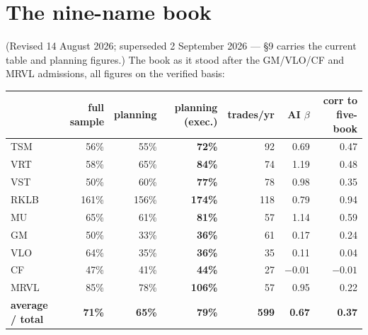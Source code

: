 \documentclass[11pt,a4paper]{article}
\begin{document}
\section{The nine-name book}

(Revised 14 August 2026; superseded 2 September 2026 --- \S9 carries the
current table and planning figures.)
The book as it stood after the GM/VLO/CF and MRVL admissions, all figures on
the verified basis:

\begin{center}
\begin{tabular}{lrrrrrr}
\toprule
 & full sample & planning & \textbf{planning (exec.)} & trades/yr & AI $\beta$ & corr to five-book \\
\midrule
TSM  &  56\% &  55\% & \textbf{72\%} &  92 & 0.69 & 0.47 \\
VRT  &  58\% &  65\% & \textbf{84\%} &  74 & 1.19 & 0.48 \\
VST  &  50\% &  60\% & \textbf{77\%} &  78 & 0.98 & 0.35 \\
RKLB & 161\% & 156\% & \textbf{174\%} & 118 & 0.79 & 0.94 \\
MU   &  65\% &  61\% & \textbf{81\%} &  57 & 1.14 & 0.59 \\
GM   &  50\% &  33\% & \textbf{36\%} &  61 & 0.17 & 0.24 \\
VLO  &  64\% &  35\% & \textbf{36\%} &  35 & 0.11 & 0.04 \\
CF   &  47\% &  41\% & \textbf{44\%} &  27 & $-0.01$ & $-0.01$ \\
MRVL &  85\% &  78\% & \textbf{106\%} &  57 & 0.95 & 0.22 \\
\midrule
\textbf{average / total} & \textbf{71\%} & \textbf{65\%} & \textbf{79\%} & \textbf{599} & \textbf{0.67} & \textbf{0.37} \\
\bottomrule
\end{tabular}
\end{center}
\end{document}

